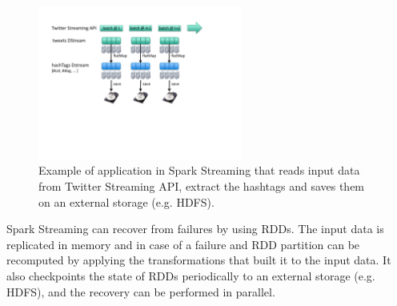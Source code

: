 \documentclass[ppgc,diss,english]{iiufrgs}
\begin{document}
\begin{figure}[!ht]
	\centering
	\includegraphics[width=0.6\textwidth]{images/spark/example.pdf}
	\caption[Example of application in Spark Streaming]{Example of application in Spark Streaming that reads input data from Twitter Streaming API, extract the hashtags and saves them on an external storage (e.g. HDFS).}
	\label{fig:s4_structure}
\end{figure}

Spark Streaming can recover from failures by using RDDs. The input data is replicated in memory and in case of a failure and RDD partition can be recomputed by applying the transformations that built it to the input data. It also checkpoints the state of RDDs periodically to an external storage (e.g. HDFS), and the recovery can be performed in parallel.
\end{document}
